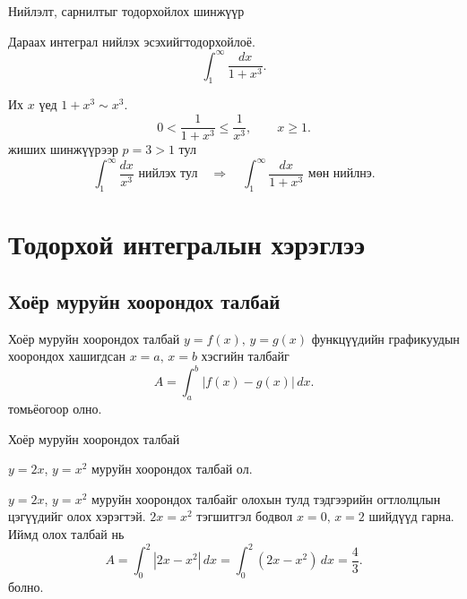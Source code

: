 \begin{frame}[allowframebreaks]{Нийлэлт, сарнилтыг тодорхойлох шинжүүр}
\begin{example}
Дараах интеграл нийлэх эсэхийгтодорхойлоё.
\[
\int_{1}^{\infty} \frac{dx}{1+x^{3}}.
\]

Их $x$ үед $1+x^3\sim x^{3}$.
\[
0 < \frac{1}{1+x^{3}} \le \frac{1}{x^{3}}, \qquad x\ge1.
\]
жиших шинжүүрээр $p=3>1$ тул  
\[
\int_{1}^{\infty}\frac{dx}{x^{3}}
\text{ нийлэх тул}
\quad\Rightarrow\quad
\int_{1}^{\infty}\frac{dx}{1+x^{3}}
\text{ мөн нийлнэ.}
\]
\end{example}
\end{frame}

\section{Тодорхой интегралын хэрэглээ}
\subsection{Хоёр муруйн хоорондох талбай}
\begin{frame}[allowframebreaks]{Хоёр муруйн хоорондох талбай}
$y=f(x) , \, y=g(x)$ функцүүдийн графикуудын хоорондох хашигдсан $x=a , \, x=b$ хэсгийн талбайг
\[
A=\int_{a}^{b} |f(x)-g(x)|\,dx.
\]
томьёогоор олно.
\end{frame}

\begin{frame}[allowframebreaks]{Хоёр муруйн хоорондох талбай}
\begin{example} $y=2x$, $y=x^2$ муруйн хоорондох талбай ол.\\
\begin{minipage}{0.6\textwidth}
\begin{fitbox}\end{fitbox}  
\end{minipage}
\begin{minipage}{0.4\textwidth}
   $y=2x$, $y=x^2$ муруйн хоорондох талбайг олохын тулд тэдгээрийн огтлолцлын цэгүүдийг олох хэрэгтэй. $2x=x^2$ тэгшитгэл бодвол $x=0,\, x=2$ шийдүүд гарна. Иймд олох талбай нь 
\[
A=\int_{0}^{2} |2x-x^2|\,dx=\int_{0}^{2} (2x-x^2)\,dx=\frac{4}{3}.
\] болно. 
\end{minipage}
\end{example}
\end{frame}

